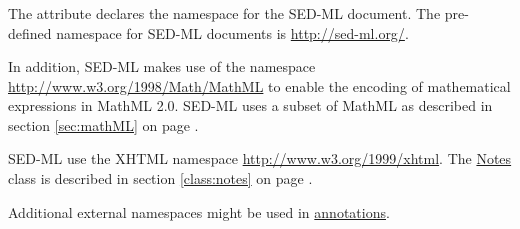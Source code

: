 \subsubsection{}
\label{sec:xmlns}
The  attribute declares the namespace for the SED-ML document. The pre-defined namespace for SED-ML documents is \url{http://sed-ml.org/}. 

In addition, SED-ML makes use of the  namespace \url{http://www.w3.org/1998/Math/MathML} to enable the encoding of mathematical expressions in MathML 2.0. SED-ML uses a subset of MathML as described in section \ref{sec:mathML} on page \pageref{sec:mathML}.

SED-ML  use the XHTML namespace \url{http://www.w3.org/1999/xhtml}.  The \hyperref[class:notes]{Notes} class is described in section \ref{class:notes} on page \pageref{class:notes}.

Additional external namespaces might be used in \hyperref[class:annotation]{annotations}. 


